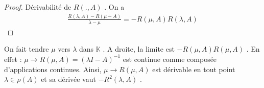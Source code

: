 \documentclass{report}
\begin{document}
{\begin{proof}
 Dérivabilité de $R(., A)$ . On a 
					\begin{align*}
					 \frac{R(\lambda, A) - R(\mu - A)}{\lambda - \mu} = - R(\mu, A)R(\lambda, A) 
					\end{align*}
\end{proof}




On fait tendre $\mu$ vers $\lambda$ dans $\mathbb{K}$ . A droite, la limite est $-R(\mu,A) R(\mu,A)$ . En effet : $\mu \rightarrow R(\mu,A) = (\lambda I - A)^{-1}$ est continue comme composée d'applications continues. Ainsi, $\mu \rightarrow R(\mu,A)$ est dérivable en tout point $\lambda \in \rho(A)$ et sa dérivée vaut $-R^2(\lambda, A)$ .\\ \\

}
\end{document}
